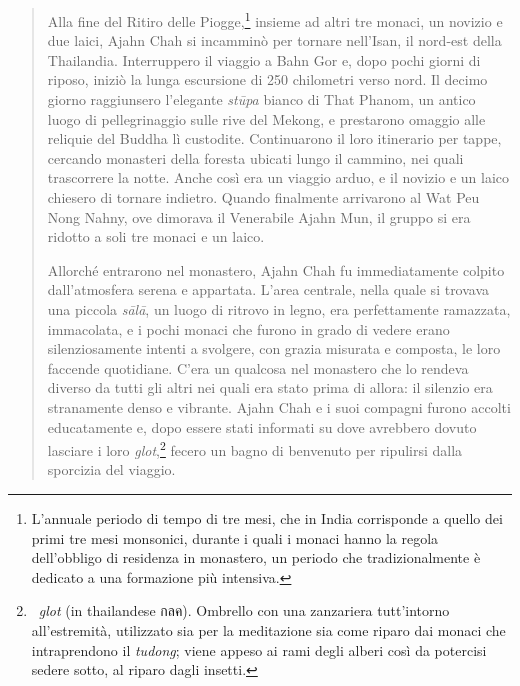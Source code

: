 \begin{quote}
Alla fine del Ritiro delle Piogge,\footnote{L'annuale periodo di tempo
  di tre mesi, che in India corrisponde a quello dei primi tre mesi
  monsonici, durante i quali i monaci hanno la regola dell'obbligo di
  residenza in monastero, un periodo che tradizionalmente è dedicato a
  una formazione più intensiva.} insieme ad altri tre monaci, un novizio
e due laici, Ajahn Chah si incamminò per tornare nell'Isan, il nord-est
della Thailandia. Interruppero il viaggio a Bahn Gor e, dopo pochi
giorni di riposo, iniziò la lunga escursione di 250 chilometri verso
nord. Il decimo giorno raggiunsero l'elegante \emph{stūpa} bianco di
That Phanom, un antico luogo di pellegrinaggio sulle rive del Mekong, e
prestarono omaggio alle reliquie del Buddha lì custodite. Continuarono
il loro itinerario per tappe, cercando monasteri della foresta ubicati
lungo il cammino, nei quali trascorrere la notte. Anche così era un
viaggio arduo, e il novizio e un laico chiesero di tornare indietro.
Quando finalmente arrivarono al Wat Peu Nong Nahny, ove dimorava il
Venerabile Ajahn Mun, il gruppo si era ridotto a soli tre monaci e un
laico.

Allorché entrarono nel monastero, Ajahn Chah fu immediatamente colpito
dall'atmosfera serena e appartata. L'area centrale, nella quale si
trovava una piccola \emph{sālā}, un luogo di ritrovo in legno, era
perfettamente ramazzata, immacolata, e i pochi monaci che furono in
grado di vedere erano silenziosamente intenti a svolgere, con grazia
misurata e composta, le loro faccende quotidiane. C'era un qualcosa nel
monastero che lo rendeva diverso da tutti gli altri nei quali era stato
prima di allora: il silenzio era stranamente denso e vibrante. Ajahn
Chah e i suoi compagni furono accolti educatamente e, dopo essere stati
informati su dove avrebbero dovuto lasciare i loro
\emph{glot},\footnote{~\emph{glot} (in thailandese กลค). Ombrello con
  una zanzariera tutt'intorno all'estremità, utilizzato sia per la
  meditazione sia come riparo dai monaci che intraprendono il
  \emph{tudong}; viene appeso ai rami degli alberi così da potercisi
  sedere sotto, al riparo dagli insetti.} fecero un bagno di benvenuto
per ripulirsi dalla sporcizia del viaggio.


\end{quote}
